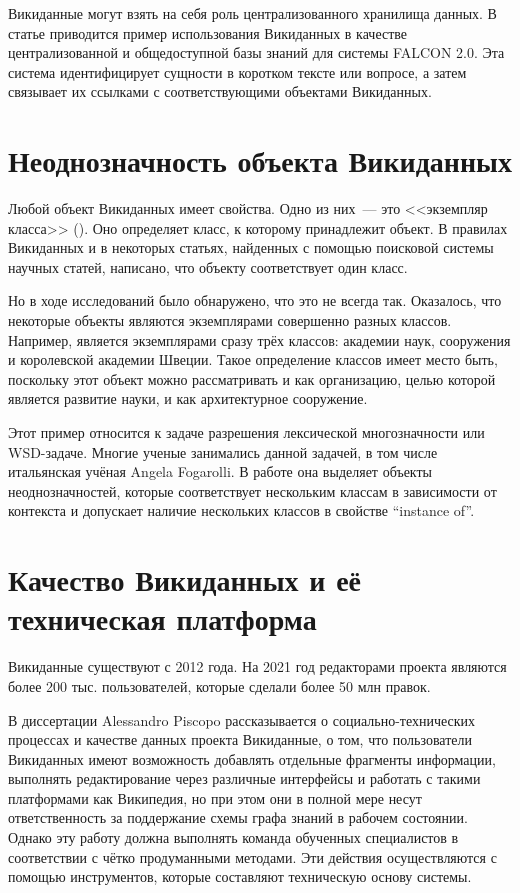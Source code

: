 Викиданные могут взять на себя роль централизованного хранилища данных. В статье\cite{Falcon_2.0} приводится пример использования Викиданных в качестве централизованной и общедоступной базы знаний для системы FALCON 2.0. Эта система идентифицирует сущности в коротком тексте или вопросе, а затем связывает их ссылками с соответствующими объектами Викиданных.

\section{Неоднозначность объекта Викиданных}

Любой объект Викиданных имеет свойства. Одно из них~--- это <<экземпляр класса>> (). Оно определяет класс, к которому принадлежит объект. В правилах Викиданных и в некоторых статьях\cite{BabelNet}, найденных с помощью поисковой системы научных статей\footnotemark {}, написано, что объекту соответствует один класс.

Но в ходе исследований было обнаружено, что это не всегда так. Оказалось, что некоторые объекты являются экземплярами совершенно разных классов. Например,  является экземплярами сразу трёх классов: академии наук, сооружения и королевской академии Швеции. Такое определение классов имеет место быть, поскольку этот объект можно рассматривать и как организацию, целью которой является развитие науки, и как архитектурное сооружение. 

Этот пример относится к задаче разрешения лексической многозначности или WSD-задаче. Многие ученые занимались данной задачей, в том числе итальянская учёная Angela Fogarolli. В работе\cite{Fogarolli} она выделяет объекты неоднозначностей, которые соответствует нескольким классам в зависимости от контекста и допускает наличие нескольких классов в свойстве ``instance of''.

\section{Качество Викиданных и её техническая платформа}

Викиданные существуют с 2012 года. На 2021 год редакторами проекта являются более 200 тыс. пользователей, которые сделали более 50 млн правок.

В диссертации Alessandro Piscopo\cite{Piscopo} рассказывается о социально-технических процессах и качестве данных проекта Викиданные, о том, что пользователи Викиданных имеют возможность добавлять отдельные фрагменты информации, выполнять редактирование через различные интерфейсы и работать с такими платформами как Википедия, но при этом они в полной мере несут ответственность за поддержание схемы графа знаний в рабочем состоянии. Однако эту работу должна выполнять команда обученных специалистов в соответствии с чётко продуманными методами. Эти действия осуществляются с помощью инструментов, которые составляют техническую основу системы.

